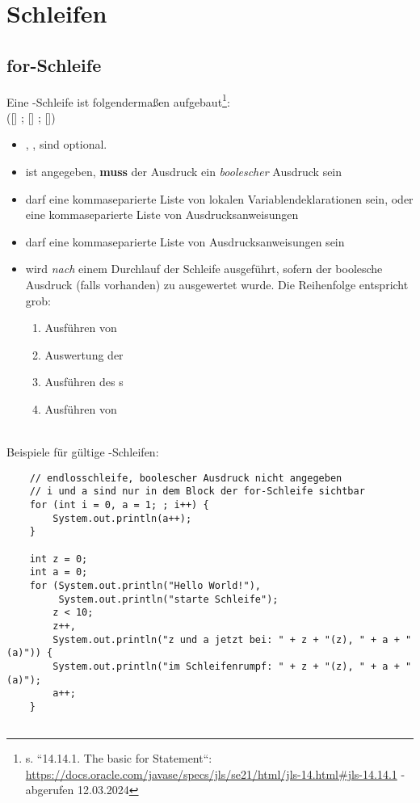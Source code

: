 \section{Schleifen}

\subsection{for-Schleife}

Eine -Schleife ist folgendermaßen aufgebaut\footnote{
s. ``14.14.1. The basic for Statement``: \url{https://docs.oracle.com/javase/specs/jls/se21/html/jls-14.html#jls-14.14.1} - abgerufen 12.03.2024
}:\\

\noindent
{} ([] ; [] ; []) \\

\begin{itemize}
    \item {}, ,  sind optional.
    \item ist  angegeben, \textbf{muss} der Ausdruck ein \textit{boolescher} Ausdruck sein
    \item {} darf eine kommaseparierte Liste von lokalen Variablendeklarationen sein, oder eine kommaseparierte Liste von Ausdrucksanweisungen
    \item {} darf eine kommaseparierte Liste von Ausdrucksanweisungen sein
    \item {} wird \textit{nach} einem Durchlauf der Schleife ausgeführt, sofern der boolesche Ausdruck (falls vorhanden) zu  ausgewertet wurde.
    Die Reihenfolge entspricht grob:
    \begin{enumerate}
        \item Ausführen von 
        \item Auswertung der 
        \item Ausführen des s
        \item Ausführen von 
    \end{enumerate}

\end{itemize}\\

\noindent
Beispiele für gültige -Schleifen:

\begin{verbatim}
    // endlosschleife, boolescher Ausdruck nicht angegeben
    // i und a sind nur in dem Block der for-Schleife sichtbar
    for (int i = 0, a = 1; ; i++) {
        System.out.println(a++);
    }

    int z = 0;
    int a = 0;
    for (System.out.println("Hello World!"),
         System.out.println("starte Schleife");
        z < 10;
        z++,
        System.out.println("z und a jetzt bei: " + z + "(z), " + a + "(a)")) {
        System.out.println("im Schleifenrumpf: " + z + "(z), " + a + "(a)");
        a++;
    }


\end{verbatim}

